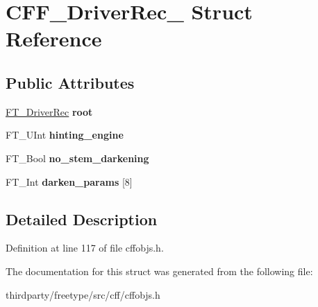 \hypertarget{struct_c_f_f___driver_rec__}{}\section{C\+F\+F\+\_\+\+Driver\+Rec\+\_\+ Struct Reference}
\label{struct_c_f_f___driver_rec__}
\subsection*{Public Attributes}
\begin{DoxyCompactItemize}
\item 
\mbox{\label{struct_c_f_f___driver_rec___af205f61710887b57a41aa39daf294f10}} 
\hyperlink{struct_f_t___driver_rec__}{F\+T\+\_\+\+Driver\+Rec} {\bfseries root}
\item 
\mbox{\label{struct_c_f_f___driver_rec___a0be810c07afaadb1774e19c9600ab042}} 
F\+T\+\_\+\+U\+Int {\bfseries hinting\+\_\+engine}
\item 
\mbox{\label{struct_c_f_f___driver_rec___a0a36c622218da1efcaacadff8150b8a6}} 
F\+T\+\_\+\+Bool {\bfseries no\+\_\+stem\+\_\+darkening}
\item 
\mbox{\label{struct_c_f_f___driver_rec___ad16eaa0416335b27310a84acfd75363b}} 
F\+T\+\_\+\+Int {\bfseries darken\+\_\+params} \mbox{[}8\mbox{]}
\end{DoxyCompactItemize}


\subsection{Detailed Description}


Definition at line 117 of file cffobjs.\+h.



The documentation for this struct was generated from the following file\+:\begin{DoxyCompactItemize}
\item 
thirdparty/freetype/src/cff/cffobjs.\+h\end{DoxyCompactItemize}
